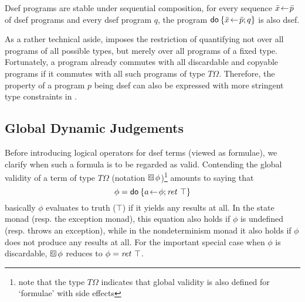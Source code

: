 \begin{prop}
  Dsef programs are stable under sequential composition, \IE for every sequence
  $\bar x\!\gets\! \bar p$ of dsef programs and every dsef program $q$, the program
  $\mathsf{do}\: \{\bar x\!\gets\!\bar p; q\}$ is also dsef.
\end{prop}

\begin{rem}
\label{rem:isa-type-restr}
As a rather technical aside, \Isabelle imposes the restriction of quantifying
not over all programs of all possible types, but merely over all programs of a
fixed type.  Fortunately, a program already commutes with all discardable and
copyable programs if it commutes with all such programs of type $T\Omega$. Therefore,
the property of a program $p$ being dsef can also be expressed with more
stringent type constraints in \Isabelle.
\end{rem}
 

\subsection{Global Dynamic Judgements}
\label{sec:glob-dynam-judg}

Before introducing logical operators for dsef terms (viewed as formulae), we
clarify when such a formula is to be regarded as valid.  Contending the global
validity of a term of type $T\Omega$ (notation $\gbox \phi$)\footnote{note that the type
$T\Omega$ indicates that global validity is also defined for `formulae' with side
effects} amounts to saying that
\[
\phi = \mathsf{do}\: \{a\!\gets\!\phi; \mathit{ret}~\top\}
\]
\IE basically $\phi$ evaluates to truth ($\top$) if it yields any results at all. In
the state monad (resp. the exception monad), this equation also holds if $\phi$
is undefined (resp. throws an exception), while in the nondeterminism
monad it also holds if $\phi$ does not produce any results at all. For the
important special case when $\phi$ is discardable, $\gbox \phi$ reduces to $\phi = \mathit{ret}~\top$.

